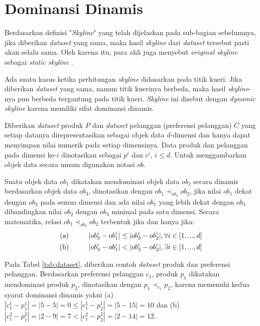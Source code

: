 \section{Dominansi Dinamis}

\tab Berdasarkan definisi "\textit{Skyline}" yang telah dijelaskan pada sub-bagian sebelumnya, jika diberikan \textit{dataset} yang sama, maka hasil \textit{skyline} dari \textit{dataset} tersebut pasti akan selalu sama. Oleh karena itu, para ahli juga menyebut \textit{original skyline} sebagai \textit{static skyline} \cite{dynamic-skyline-2}.

Ada suatu kasus ketika perhitungan \textit{skyline} didasarkan pada titik kueri. Jika diberikan \textit{dataset} yang sama, namun titik kuerinya berbeda, maka hasil \textit{skyline}-nya pun berbeda tergantung pada titik kueri. \textit{Skyline} ini disebut dengan \textit{dynamic skyline} karena memiliki sifat dominansi dinamis. 

Diberikan \textit{dataset} produk $P$ dan \textit{dataset} pelanggan (preferensi pelanggan) $C$ yang setiap datanya direpresentasikan sebagai objek data $d$-dimensi dan hanya dapat menyimpan nilai numerik pada setiap dimensinya. Data produk dan pelanggan pada dimensi ke-$i$ dinotasikan sebagai $p^i$ dan $c^i$, $i \leq d$. Untuk menggambarkan objek data secara umum digunakan notasi $ob$.

Suatu objek data $ob_1$ dikatakan mendominasi objek data $ob_2$ secara dinamis berdasarkan objek data $ob_3$, dinotasikan dengan $ob_1 \prec_{ob_3} ob_2$, jika nilai $ob_1$ dekat dengan $ob_3$ pada semua dimensi dan ada nilai $ob_1$ yang lebih dekat dengan $ob_3$ dibandingkan nilai $ob_2$ dengan $ob_3$ minimal pada satu dimensi. Secara matematika, relasi $ob_1 \prec_{ob_3} ob_2$ terbentuk jika dan hanya jika:
\begin{equation}\label{eq:syarat-dominansi-dinamis}
\begin{split}
\text{(a)} \hspace*{1cm} |ob_3^i - ob_1^i| \leq |ob_3^i - ob_2^i|, \forall i \in [1, ..., d] \\
\text{(b)} \hspace*{1cm} |ob_3^i - ob_1^i| < |ob_3^i - ob_2^i|, \exists i \in [1, ..., d]
\end{split}
\end{equation}

Pada Tabel \ref{tab:dataset}, diberikan contoh \textit{dataset} produk dan preferensi pelanggan. Berdasarkan preferensi pelanggan $c_1$, produk $p_1$ dikatakan mendominasi produk $p_2$, dinotasikan dengan $p_1 \prec_{c_1} p_2$, karena memenuhi kedua syarat dominansi dinamis yakni (a) $|c_1^1 - p_1^1| = |5-5| = 0 \leq |c_1^1 - p_2^1| = |5-15| = 10$ dan (b) $|c_1^2 - p_1^2| = |2-9| = 7 < |c_1^2 - p_2^2| = |2-14| = 12$.

